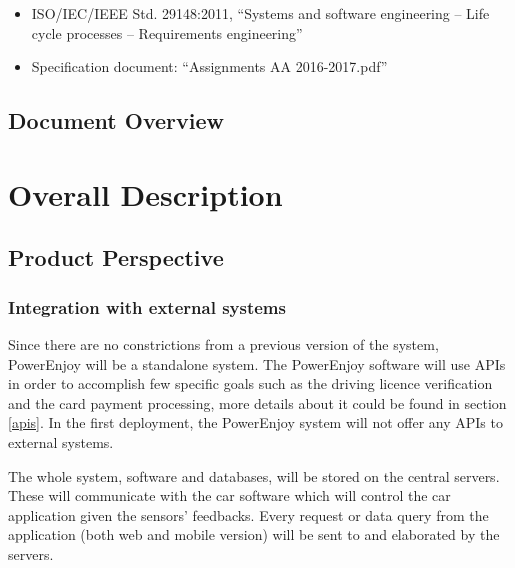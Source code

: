 \documentclass[english]{article}
\begin{document}
\begin{itemize}
	\item{ISO/IEC/IEEE Std. 29148:2011, “Systems and software engineering -- Life cycle processes -- Requirements engineering”}
	\item{Specification document: “Assignments AA 2016-2017.pdf”}
\end{itemize}

\subsection{Document Overview}

\newpage{}

\section{Overall Description}

\subsection{Product Perspective}


\subsubsection{Integration with external systems}

Since there are no constrictions from a previous version of the system, PowerEnjoy will be a standalone system.
The PowerEnjoy software will use APIs in order to accomplish few specific goals such as the driving licence verification and the card payment processing, more details about it could be found in section \ref{apis}.
In the first deployment, the PowerEnjoy system will not offer any APIs to external systems.

The whole system, software and databases, will be stored on the central servers. These will communicate with the car software which will control the car application given the sensors' feedbacks.
Every request or data query from the application (both web and mobile version) will be sent to and elaborated by the servers.
\end{document}
